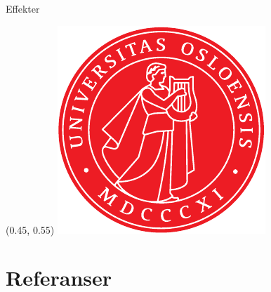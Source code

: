 \documentclass[norsk]{beamer}
\begin{document}
\begin{frame}{Effekter}
    {
        \begin{textblock}{0.3}(0.45, 0.55)
            \includegraphics[width = \textwidth]{MathDept-images/MathDept-apollon}
        \end{textblock}
    }
\end{frame}


\section{Referanser}
\end{document}
